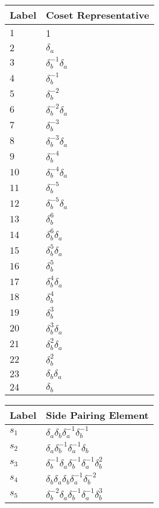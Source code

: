 \documentclass{article}
\begin{document}

\begin{center}
\begin{tabular}{ll}
\toprule
Label & Coset Representative\\
\midrule
$1$ & 1 \\
$2$ & $\delta_a^{}$ \\
$3$ & $\delta_b^{-1}\delta_a^{}$ \\
$4$ & $\delta_b^{-1}$ \\
$5$ & $\delta_b^{-2}$ \\
$6$ & $\delta_b^{-2}\delta_a^{}$ \\
$7$ & $\delta_b^{-3}$ \\
$8$ & $\delta_b^{-3}\delta_a^{}$ \\
$9$ & $\delta_b^{-4}$ \\
$10$ & $\delta_b^{-4}\delta_a^{}$ \\
$11$ & $\delta_b^{-5}$ \\
$12$ & $\delta_b^{-5}\delta_a^{}$ \\
$13$ & $\delta_b^{6}$ \\
$14$ & $\delta_b^{6}\delta_a^{}$ \\
$15$ & $\delta_b^{5}\delta_a^{}$ \\
$16$ & $\delta_b^{5}$ \\
$17$ & $\delta_b^{4}\delta_a^{}$ \\
$18$ & $\delta_b^{4}$ \\
$19$ & $\delta_b^{3}$ \\
$20$ & $\delta_b^{3}\delta_a^{}$ \\
$21$ & $\delta_b^{2}\delta_a^{}$ \\
$22$ & $\delta_b^{2}$ \\
$23$ & $\delta_b^{}\delta_a^{}$ \\
$24$ & $\delta_b^{}$ \\
\bottomrule
\end{tabular}
\hfill
\begin{tabular}{ll}
\toprule
Label & Side Pairing Element\\
\midrule
$s_{1}$ & $\delta_a^{}\delta_b^{}\delta_a^{-1}\delta_b^{-1}$ \\
$s_{2}$ & $\delta_a^{}\delta_b^{-1}\delta_a^{-1}\delta_b^{}$ \\
$s_{3}$ & $\delta_b^{-1}\delta_a^{}\delta_b^{-1}\delta_a^{-1}\delta_b^{2}$ \\
$s_{4}$ & $\delta_b^{}\delta_a^{}\delta_b^{}\delta_a^{-1}\delta_b^{-2}$ \\
$s_{5}$ & $\delta_b^{-2}\delta_a^{}\delta_b^{-1}\delta_a^{-1}\delta_b^{3}$ \\

\end{tabular}
\end{center}
\end{document}
